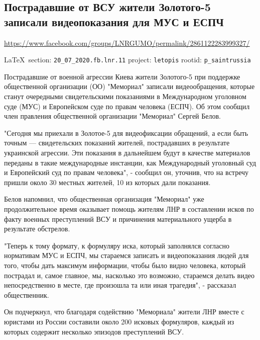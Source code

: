  
 

\subsection{Пострадавшие от ВСУ жители Золотого-5 записали видеопоказания для МУС и ЕСПЧ }
\label{sec:20_07_2020.fb.lnr.11}
\url{https://www.facebook.com/groups/LNRGUMO/permalink/2861122283999327/}
  
\vspace{0.5cm}
{\small\LaTeX~section: \verb|20_07_2020.fb.lnr.11| project: \verb|letopis| rootid: \verb|p_saintrussia|}
\vspace{0.5cm}

Пострадавшие от военной агрессии Киева жители Золотого-5 при поддержке
общественной организации (ОО) "Мемориал" записали видеообращения, которые
станут очередными свидетельскими показаниями в Международном уголовном суде
(МУС) и Европейском суде по правам человека (ЕСПЧ). Об этом сообщил член
правления общественной организации "Мемориал" Сергей Белов. 

"Сегодня мы приехали в Золотое-5 для видеофиксации обращений, а если быть
точным --- свидетельских показаний жителей, пострадавших в результате украинской
агрессии. Эти показания в дальнейшем будут в качестве материалов переданы в
такие международные инстанции, как Международный уголовный суд и Европейский
суд по правам человека", - сообщил он, уточнив, что на встречу пришли около 30
местных жителей, 10 из которых дали показания. 

Белов напомнил, что общественная организация "Мемориал" уже продолжительное
время оказывает помощь жителям ЛНР в составлении исков по факту военных
преступлений ВСУ и причинения материального ущерба в результате обстрелов. 

"Теперь к тому формату, к формуляру иска, который заполнялся согласно
нормативам МУС и ЕСПЧ, мы стараемся записать и видеопоказания людей для того,
чтобы дать максимум информации, чтобы было видно человека, который пострадал и,
самое главное, мы, насколько это возможно, стараемся делать видео
непосредственно в месте, где произошла та или иная трагедия", - рассказал
общественник. 

Он подчеркнул, что благодаря содействию "Мемориала" жители ЛНР вместе с
юристами из России составили около 200 исковых формуляров, каждый из которых
содержит несколько эпизодов преступлений ВСУ. 

